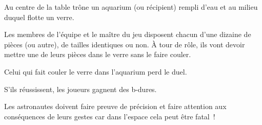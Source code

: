 \documentclass{grand-jeu}
\begin{document}
\begin{liste-materiel}
\end{liste-materiel}

\begin{regles}
Au centre de la table trône un aquarium (ou récipient) rempli d'eau et au milieu duquel flotte un verre.

Les membres de l'équipe et le maître du jeu disposent chacun d'une dizaine de pièces (ou autre), de tailles identiques ou non. À tour de rôle, ils vont devoir mettre une de leurs pièces dans le verre sans le faire couler. 

Celui qui fait couler le verre dans l'aquarium perd le duel.

S’ils réussissent, les joueurs gagnent des b-dures. 
\end{regles}

\begin{imaginaire}
Les astronautes doivent faire preuve de précision et faire attention aux conséquences de leurs gestes car dans l'espace cela peut être fatal ! 
\end{imaginaire}

\begin{moments-stop}
\end{moments-stop}
\end{document}

